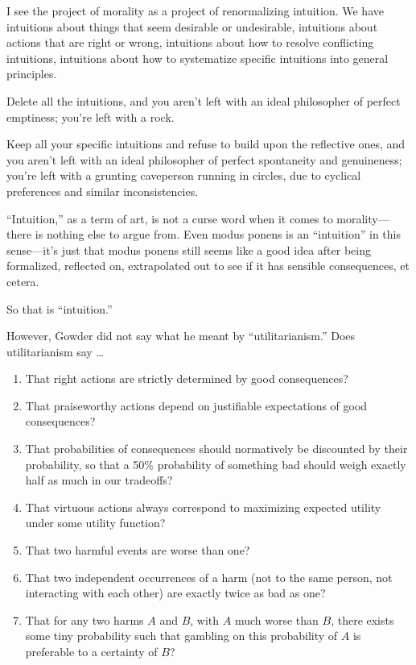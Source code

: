 {
 I see the project of morality as a project of renormalizing
intuition. We have intuitions about things that seem desirable or
undesirable, intuitions about actions that are right or wrong,
intuitions about how to resolve conflicting intuitions, intuitions
about how to systematize specific intuitions into general principles.}

{
 Delete all the intuitions, and you aren't left
with an ideal philosopher of perfect emptiness; you're
left with a rock.}

{
 Keep all your specific intuitions and refuse to build upon the
reflective ones, and you aren't left with an ideal
philosopher of perfect spontaneity and genuineness;
you're left with a grunting caveperson running in
circles, due to cyclical preferences and similar inconsistencies.}

{
 ``Intuition,'' as a term of
art, is not a curse word when it comes to morality---there is nothing
else to argue from. Even modus ponens is an
``intuition'' in this
sense---it's just that modus ponens still seems like a
good idea after being formalized, reflected on, extrapolated out to see
if it has sensible consequences, et cetera.}

{
 So that is ``intuition.''}

{
 However, Gowder did not say what he meant by
``utilitarianism.'' Does
utilitarianism say \ldots}

\begin{enumerate}
\item  That right actions are strictly determined by good consequences?
\item  That praiseworthy actions depend on justifiable expectations of
good consequences?
\item  That probabilities of consequences should normatively be
discounted by their probability, so that a 50\% probability of
something bad should weigh exactly half as much in our tradeoffs?
\item  That virtuous actions always correspond to maximizing expected
utility under some utility function?
\item  That two harmful events are worse than one?
\item  That two independent occurrences of a harm (not to the same
person, not interacting with each other) are exactly twice as bad as
one?
\item  That for any two harms $A$ and $B$, with $A$ much worse than $B$, there
exists some tiny probability such that gambling on this probability of
$A$ is preferable to a certainty of $B$?
\end{enumerate}

